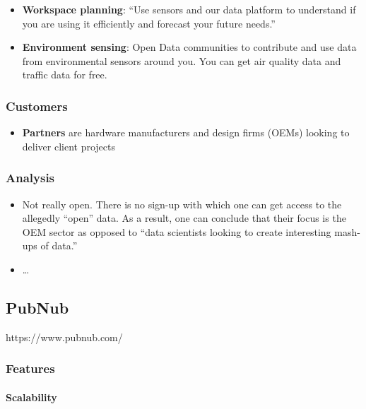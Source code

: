 \begin{itemize}
\tightlist
\item
  \textbf{Workspace planning}: ``Use sensors and our data platform to
  understand if you are using it efficiently and forecast your future
  needs.''
\item
  \textbf{Environment sensing}: Open Data communities to contribute and
  use data from environmental sensors around you. You can get air
  quality data and traffic data for free.
\end{itemize}

\subsubsection{Customers}\label{customers}

\begin{itemize}
\tightlist
\item
  \textbf{Partners} are hardware manufacturers and design firms (OEMs)
  looking to deliver client projects
\end{itemize}

\subsubsection{Analysis}\label{analysis}

\begin{itemize}
\tightlist
\item
  Not really open. There is no sign-up with which one can get access to
  the allegedly ``open'' data. As a result, one can conclude that their
  focus is the OEM sector as opposed to ``data scientists looking to
  create interesting mash-ups of data.''
\item
  \ldots{}
\end{itemize}

\subsection{PubNub}\label{pubnub}

https://www.pubnub.com/

\subsubsection{Features}\label{features-1}

\paragraph{Scalability}\label{scalability}

